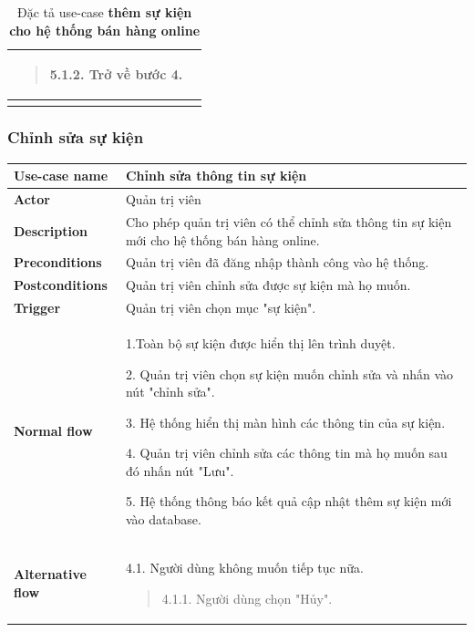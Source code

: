{\begin{longtable}{| p{} | p{} |}
\begin{quote}
            5.1.2. Trở về bước 4.
        \end{quote}

        \\
        \hline
        \caption{Đặc tả use-case \textbf{thêm sự kiện cho hệ thống bán hàng online}}
    \end{longtable}
}

\subsubsection{Chỉnh sửa sự kiện}
{
    \setlength\extrarowheight{6pt}
    \begin{longtable}{| p{} | p{} |}
        \hline
        \textbf{Use-case name}
         &
        Chỉnh sửa thông tin sự kiện
        \\
        \hline
        \textbf{Actor}
         &
        Quản trị viên
        \\
        \hline
        \textbf{Description}
         &
        Cho phép quản trị viên có thể chỉnh sửa thông tin sự kiện mới cho hệ thống bán hàng online.
        \\
        \hline
        \textbf{Preconditions}
         &
        Quản trị viên đã đăng nhập thành công vào hệ thống.
        \\
        \hline
        \textbf{Postconditions}
         &
        Quản trị viên chỉnh sửa được sự kiện mà họ muốn.
        \\
        \hline
        \textbf{Trigger}
         &
        Quản trị viên chọn mục "sự kiện".
        \\
        \hline
        \begin{flushleft}
            \textbf{Normal flow}
        \end{flushleft}
         &
        1.Toàn bộ sự kiện được hiển thị lên trình duyệt.

        2. Quản trị viên chọn sự kiện muốn chỉnh sửa và nhấn vào nút "chỉnh sửa".

        3. Hệ thống hiển thị màn hình các thông tin của sự kiện.

        4. Quản trị viên chỉnh sửa các thông tin mà họ muốn sau đó nhấn nút "Lưu".

        5. Hệ thống thông báo kết quả cập nhật thêm sự kiện mới vào database.
        \\
        \hline
        \begin{flushleft}
            \textbf{Alternative flow}
        \end{flushleft}
         &
        4.1. Người dùng không muốn tiếp tục nữa.
        \begin{quote}
            4.1.1. Người dùng chọn "Hủy".


\end{quote}
\end{longtable}}
